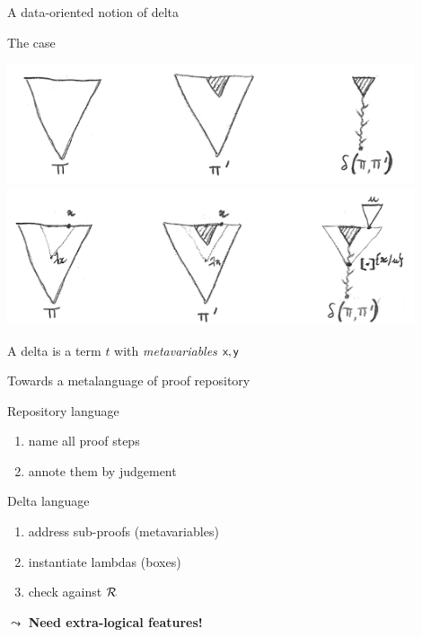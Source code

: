 \documentclass[ignorenonframetext,red]{beamer}
\begin{document}
\begin{frame}{A data-oriented notion of delta}
  \begin{block}{The  case}
    \begin{overlayarea}{\textwidth}{10em}
      {\vspace{0.6em}\centering\includegraphics[width=0.90\textwidth]{images/delta.png}\\}%
      {\hspace{1em}\centering\includegraphics[width=0.90\textwidth]{images/delta2.png}\\}%
    \end{overlayarea}
    A delta is a term $t$ with \emph{metavariables} \alert{$\textsf{x},
      \textsf{y}$}
  \pause
  \end{block}
\end{frame}

\begin{frame}{Towards a metalanguage of proof repository}
  \begin{block}{Repository language}
    \begin{enumerate}
    \item name all proof steps
    \item annote them by judgement
    \end{enumerate}
  \end{block}
  \begin{block}{Delta language}
    \begin{enumerate}
    \item address sub-proofs (metavariables)
    \item instantiate lambdas (boxes)
    \item check against $\mathcal{R}$
    \end{enumerate}
  \end{block}
  \pause
  $\leadsto$ \bf Need extra-logical features!
\end{frame}
\end{document}
